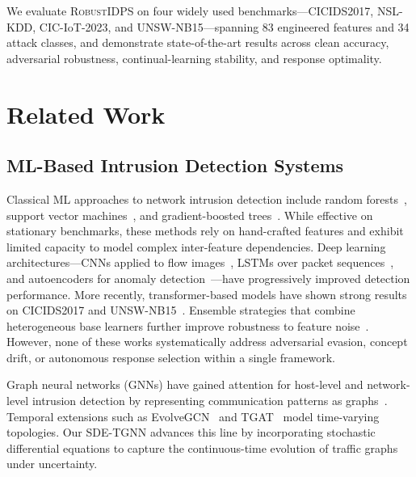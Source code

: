 \documentclass[journal,twoside]{IEEEtran}
\begin{document}
We evaluate \textsc{RobustIDPS} on four widely used benchmarks---CICIDS2017,
NSL-KDD, CIC-IoT-2023, and UNSW-NB15---spanning 83 engineered features and 34
attack classes, and demonstrate state-of-the-art results across clean accuracy,
adversarial robustness, continual-learning stability, and response optimality.

\section{Related Work}
\label{sec:related_work}

\subsection{ML-Based Intrusion Detection Systems}
\label{sec:rw_ml_ids}

Classical ML approaches to network intrusion detection include random
forests~\cite{zhang2008random}, support vector
machines~\cite{mukkamala2002intrusion}, and gradient-boosted
trees~\cite{dhaliwal2018effective}. While effective on stationary benchmarks,
these methods rely on hand-crafted features and exhibit limited capacity to
model complex inter-feature dependencies. Deep learning architectures---CNNs
applied to flow images~\cite{wang2017malware}, LSTMs over packet
sequences~\cite{yin2017deep}, and autoencoders for anomaly
detection~\cite{mirsky2018kitsune}---have progressively improved detection
performance. More recently, transformer-based models have shown strong results
on CICIDS2017 and UNSW-NB15~\cite{wu2022rtids, ferriyan2022deep}. Ensemble
strategies that combine heterogeneous base learners further improve robustness
to feature noise~\cite{gao2019adaptive}. However, none of these works
systematically address adversarial evasion, concept drift, or autonomous
response selection within a single framework.

Graph neural networks (GNNs) have gained attention for host-level and
network-level intrusion detection by representing communication patterns as
graphs~\cite{lo2022graphsage, chang2021graph}. Temporal extensions such as
EvolveGCN~\cite{pareja2020evolvegcn} and TGAT~\cite{xu2020inductive} model
time-varying topologies. Our SDE-TGNN advances this line by incorporating
stochastic differential equations to capture the continuous-time evolution of
traffic graphs under uncertainty.
\end{document}
